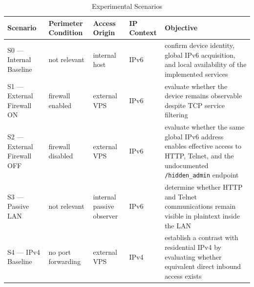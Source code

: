 \begin{table}[H]
    \centering
    \caption{Experimental Scenarios}
    \label{tab:experimental-scenarios}
    \begin{tabularx}{\textwidth}{p{} L L p{0.08\textwidth} L}
        \toprule
        \textbf{\color{white}Scenario} & \textbf{\color{white}Perimeter Condition} & \textbf{\color{white}Access Origin} & \textbf{\color{white}IP Context} & \textbf{\color{white}Objective} \\
        \midrule
        S0 --- Internal Baseline & not relevant & internal host & IPv6 & confirm device identity, global IPv6 acquisition, and local availability of the implemented services \\
        S1 --- External Firewall ON & firewall enabled & external VPS & IPv6 & evaluate whether the device remains observable despite TCP service filtering \\
        S2 --- External Firewall OFF & firewall disabled & external VPS & IPv6 & evaluate whether the same global IPv6 address enables effective access to HTTP, Telnet, and the undocumented \texttt{/hidden\_admin} endpoint \\
        S3 --- Passive LAN & not relevant & internal passive observer & IPv6 & determine whether HTTP and Telnet communications remain visible in plaintext inside the LAN \\
        S4 --- IPv4 Baseline & no port forwarding & external VPS & IPv4 & establish a contrast with residential IPv4 by evaluating whether equivalent direct inbound access exists \\
        \bottomrule
    \end{tabularx}
\end{table}
